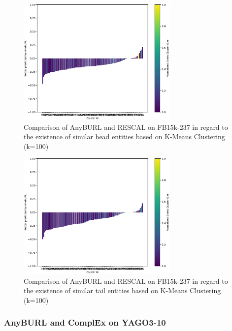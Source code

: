 \begin{figure}[H]
\centering
\includegraphics[width=0.7\textwidth]{images/head_cluster_100_anyburl_rescal_fb15k.PNG}
\caption{Comparison of AnyBURL and RESCAL on FB15k-237 in regard to the existence of similar head entities based on K-Means Clustering (k=100)}
\label{fig:head_cluster_100_anyburl_rescal_fb15k}
\end{figure}

\begin{figure}[H]
\centering
\includegraphics[width=0.7\textwidth]{images/tail_cluster_100_anyburl_rescal_fb15k.PNG}
\caption{Comparison of AnyBURL and RESCAL on FB15k-237 in regard to the existence of similar tail entities based on K-Means Clustering (k=100)}
\label{fig:tail_cluster_100_anyburl_rescal_fb15k}
\end{figure}

\subsubsection{AnyBURL and ComplEx on YAGO3-10}

